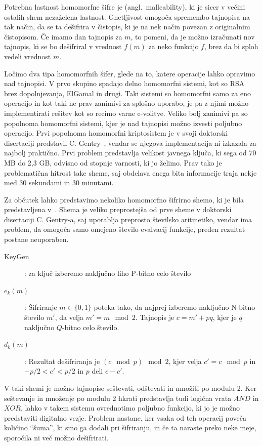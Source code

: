 \documentclass[12pt,a4paper,openany,tikz]{book}
\theoremstyle{plain}
\theoremstyle{definition}
\begin{document}
Potrebna lastnost homomorfne šifre je  (angl.\ malleability), ki je sicer v večini ostalih shem nezaželena lastnost. Gnetljivost omogoča spremembo tajnopisa na tak način, da se ta dešifrira v čistopis, ki je na nek način povezan z originalnim čistopisom. Če imamo dan tajnopis za $m$, to pomeni, da je možno izračunati nov tajnopis, ki se bo dešifriral v vrednost $f(m)$ za neko funkcijo $f$, brez da bi sploh vedeli vrednost $m$.

Ločimo dva tipa homomorfnih šifer, glede na to, katere operacije lahko opravimo nad tajnopisi. V prvo skupino spadajo delno homomorfni sistemi, kot so RSA brez dopolnjevanja, ElGamal in drugi. Taki sistemi so homomorfni samo za eno operacijo in kot taki ne prav zanimivi za splošno uporabo, je pa z njimi možno implementirati rešitev kot so recimo varne e-volitve. Veliko bolj zanimivi pa so popolnoma homomorfni sistemi, kjer je nad tajnopisi možno izvesti poljubno operacijo. Prvi popolnoma homomorfni kriptosistem je v svoji doktorski disertaciji predstavil C. Gentry~\cite{gentry2009fully}, vendar se njegova implementacija ni izkazala za najbolj praktično. Prvi problem predstavlja velikost javnega ključa, ki sega od 70 MB do 2,3 GB, odvisno od stopnje varnosti, ki jo želimo. Prav tako je problematična hitrost take sheme, saj obdelava enega bita informacije traja nekje med 30 sekundami in 30 minutami.

Za občutek lahko predstavimo nekoliko homomorfno šifrirno shemo, ki je bila predstavljena v~\cite{gentry2010computing}. Shema je veliko preprostejša od prve sheme v doktorski disertaciji C. Gentry-a, saj uporablja preprosto številsko aritmetiko, vendar ima problem, da omogoča samo omejeno število evalvacij funkcije, preden rezultat postane neuporaben.

\begin{description}
  \item[KeyGen]: za ključ izberemo naključno liho P-bitno celo število
  \item[$e_k(m)$]: Šifriranje $m \in \{0,1\}$ poteka tako, da najprej izberemo naključno N-bitno število $m'$, da velja $m' = m \mod 2$. Tajnopis je $c=m'+pq$, kjer je $q$ naključno $Q$-bitno celo število.
  \item[$d_k(m)$]: Rezultat dešifriranja je $(c \mod p) \mod 2$, kjer velja $c'=c \mod p$ in $-p/2 < c' < p/2$ in $p$ deli $c-c'$.
\end{description}

V taki shemi je možno tajnopise seštevati, odštevati in množiti po modulu 2. Ker seštevanje in množenje po modulu 2 hkrati predstavlja tudi logična vrata $AND$ in $XOR$, lahko v takem sistemu ovrednotimo poljubno funkcijo, ki jo je možno predstaviti digitalno vezje. Problem nastane, ker vsaka od teh operacij poveča količino ``šuma'', ki smo ga dodali pri šifriranju, in če ta naraste preko neke meje, sporočila ni več možno dešifrirati.
\end{document}
